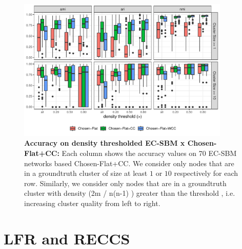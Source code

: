 \documentclass[aps,pre,superscriptaddress]{article}
\begin{document}
\begin{figure}[!htpb]
    \centering
    \includegraphics[width=0.9\textwidth]{figures/density_acc_sbm.pdf}
    \caption[]{\textbf{Accuracy on density thresholded EC-SBM x Chosen-Flat+CC:} 
        Each column shows the accuracy values on 70 EC-SBM networks based Chosen-Flat+CC. 
        We consider only nodes that are in a groundtruth cluster of size at least $1$ or $10$ respectively for each row.
        Similarly, we consider only nodes that are in a groundtruth cluster with density (2m / n(n-1) ) greater than the threshold , i.e. increasing cluster quality from left to right. }
\end{figure}

\clearpage
\section{LFR and RECCS}
\end{document}

